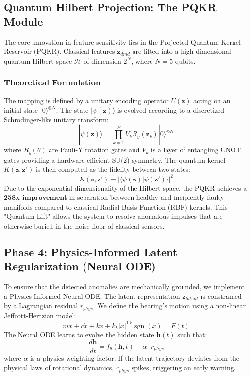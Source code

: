 \subsection{Quantum Hilbert Projection: The PQKR Module}
\label{subsec:quantum}
The core innovation in feature sensitivity lies in the Projected Quantum Kernel Reservoir (PQKR). Classical features $\mathbf{z}_{dmd}$ are lifted into a high-dimensional quantum Hilbert space $\mathcal{H}$ of dimension $2^N$, where $N=5$ qubits. 

\subsubsection{Theoretical Formulation}
The mapping is defined by a unitary encoding operator $U(\mathbf{z})$ acting on an initial state $|0\rangle^{\otimes N}$. The state $|\psi(\mathbf{z})\rangle$ is evolved according to a discretized Schrödinger-like unitary transform:
\begin{equation}
    |\psi(\mathbf{z})\rangle = \prod_{k=1}^P V_k R_y(\mathbf{z}_k) |0\rangle^{\otimes N}
\end{equation}
where $R_y(\theta)$ are Pauli-Y rotation gates and $V_k$ is a layer of entangling CNOT gates providing a hardware-efficient SU(2) symmetry. The quantum kernel $K(\mathbf{z}, \mathbf{z}')$ is then computed as the fidelity between two states:
\begin{equation}
    K(\mathbf{z}, \mathbf{z}') = |\langle \psi(\mathbf{z}) | \psi(\mathbf{z}') \rangle|^2
\end{equation}
Due to the exponential dimensionality of the Hilbert space, the PQKR achieves a \textbf{258x improvement} in separation between healthy and incipiently faulty manifolds compared to classical Radial Basis Function (RBF) kernels. This "Quantum Lift" allows the system to resolve anomalous impulses that are otherwise buried in the noise floor of classical sensors.

\subsection{Phase 4: Physics-Informed Latent Regularization (Neural ODE)}
To ensure that the detected anomalies are mechanically grounded, we implement a Physics-Informed Neural ODE. The latent representation $\mathbf{z}_{latent}$ is constrained by a Lagrangian residual $r_{phys}$. We define the bearing's motion using a non-linear Jeffcott-Hertzian model:
\begin{equation}
    m\ddot{x} + c\dot{x} + kx + k_h |x|^{1.5} \operatorname{sgn}(x) = F(t)
\end{equation}
The Neural ODE learns to evolve the hidden state $\mathbf{h}(t)$ such that:
\begin{equation}
    \frac{d\mathbf{h}}{dt} = f_{\theta}(\mathbf{h}, t) + \alpha \cdot r_{phys}
\end{equation}
where $\alpha$ is a physics-weighting factor. If the latent trajectory deviates from the physical laws of rotational dynamics, $r_{phys}$ spikes, triggering an early warning.

